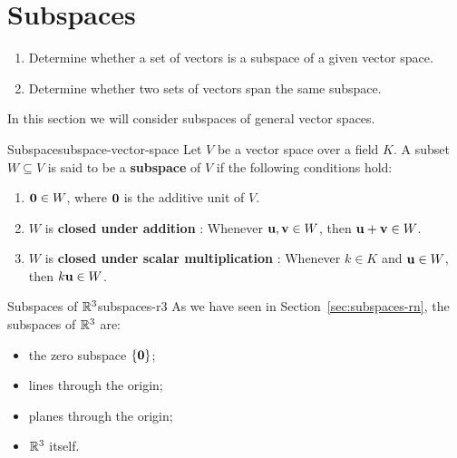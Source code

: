 \section{Subspaces}
\label{sec:vector-space-subspaces}

\begin{outcome}
  \begin{enumerate}
  \item Determine whether a set of vectors is a subspace of a given
    vector space.
  \item Determine whether two sets of vectors span the same subspace.
  \end{enumerate}
\end{outcome}

In this section we will consider subspaces of general vector spaces.

\begin{definition}{Subspace}{subspace-vector-space}
  Let $V$ be a vector space over a field $K$. A subset $W\subseteq V$
  is said to be a \textbf{subspace}%
   of\/ $V$ if the following conditions hold:
  \begin{enumerate}
  \item $\vect{0}\in W$, where $\vect{0}$ is the additive unit of\/ $V$.
  \item $W$ is \textbf{closed under addition}%
    : Whenever $\vect{u}, \vect{v}\in W$,
    then $\vect{u} + \vect{v}\in W$.
  \item $W$ is \textbf{closed under scalar multiplication}%
    : Whenever $k\in K$ and
    $\vect{u}\in W$, then $k\vect{u}\in W$.
  \end{enumerate}
\end{definition}

\begin{example}{Subspaces of $\mathbb{R}^3$}{subspaces-r3}
  As we have seen in Section~\ref{sec:subspaces-rn}, the subspaces of
  $\mathbb{R}^3$ are:
  \begin{itemize}
  \item the zero subspace%
     $\set{\vect{0}}$;
  \item lines through the origin;
  \item planes through the origin;
  \item $\mathbb{R}^3$ itself.
  \end{itemize}
\end{example}

